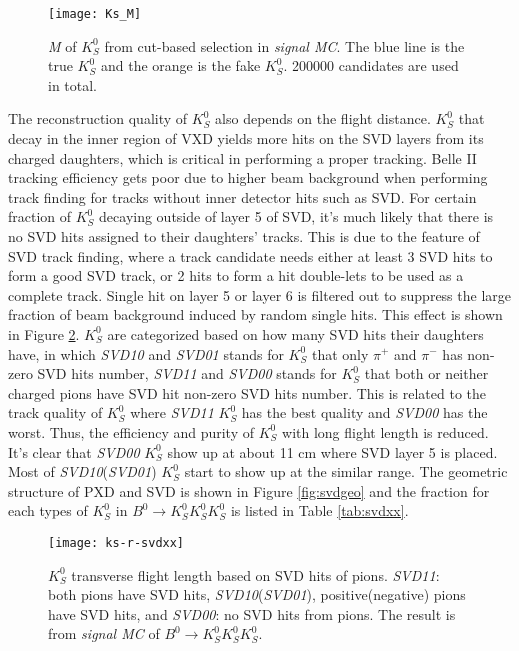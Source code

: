 \begin{figure}[ht]
	\centering 
	\texttt{[image: Ks\_M]}
	\caption{\textit{M} of $K_S^0$ from cut-based selection in \textit{signal MC}. The blue line is the true $K_S^0$ and the orange is the fake $K_S^0$. 200000 candidates are used in total. }
	\label{fig:ksM_sigmc}
\end{figure}
\begin{comment}
The $K_S^0$ candidates from ``stdKshort:merged" is the default way to obtain $K_S^0$ in the current BASF2, 
however, the limitation of this cut-based $K_S^0$ reconstruction is the pollution from fake $K_S^0$. Using these $K_S^0$ candidates to reconstruct $B^0 \to K_S^0  K_S^0  K_S^0$, as long as one of three $K_S^0$ is fake, the reconstructed $B^0$ is fake, too. 
\end{comment}

 The reconstruction quality of $K_S^0$ also depends on the flight distance. $K_S^0$ that decay in the inner region of VXD yields more hits on the SVD layers from its charged daughters, which is critical in performing a proper tracking. Belle II tracking efficiency gets poor due to higher beam background when performing track finding for tracks without inner detector hits such as SVD. For certain fraction of $K_S^0$ decaying outside of layer 5 of SVD, it's much likely that there is no SVD hits assigned to their daughters' tracks. This is due to the feature of SVD track finding, where a track candidate needs either at least 3 SVD hits to form a good SVD track, or 2 hits to form a hit double-lets to be used as a complete track. Single hit on layer 5 or layer 6 is filtered out to suppress the large fraction of beam background induced by random single hits. This effect is shown in Figure \ref{fig:ks-r-svdxx}. $K_S^0$ are categorized based on how many SVD hits their daughters have, in which \textit{SVD10} and \textit{SVD01} stands for $K_S^0$ that only $\pi^+$ and $\pi^-$ has non-zero SVD hits number, \textit{SVD11} and \textit{SVD00} stands for $K_S^0$ that both or neither charged pions have SVD hit non-zero SVD hits number. This is related to the track quality of $K_S^0$ where \textit{SVD11} $K_S^0$ has the best quality and \textit{SVD00} has the worst. Thus, the efficiency and purity of $K_S^0$ with long flight length is reduced. It's clear that \textit{SVD00} $K_S^0$ show up at about 11 cm where SVD layer 5 is placed. Most of \textit{SVD10}(\textit{SVD01}) $K_S^0$ start to show up at the similar range. The geometric structure of PXD and SVD is shown in Figure \ref{fig:svdgeo} and the fraction for each types of $K_S^0$ in $B^0 \to K_S^0  K_S^0  K_S^0$ is listed in Table \ref{tab:svdxx}.
\begin{figure}[htpb]
	\centering
	\texttt{[image: ks-r-svdxx]}
	\caption{$K_S^0$ transverse flight length based on SVD hits of pions. \textit{SVD11}: both pions have SVD hits, \textit{SVD10}(\textit{SVD01}), positive(negative) pions have SVD hits, and \textit{SVD00}: no SVD hits from pions. The result is from \textit{signal MC} of $B^0 \to K_S^0  K_S^0  K_S^0$.}
	\label{fig:ks-r-svdxx}
\end{figure}

